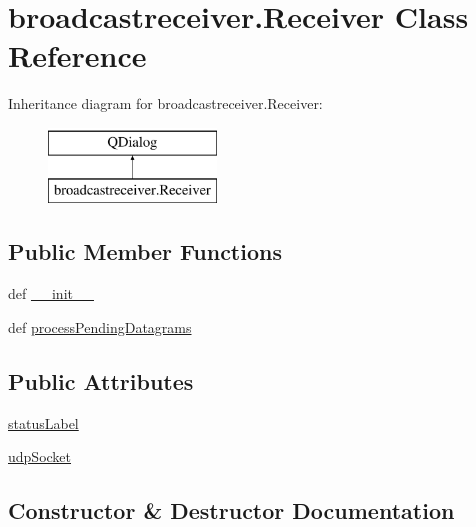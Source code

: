 \hypertarget{classbroadcastreceiver_1_1Receiver}{}\section{broadcastreceiver.\+Receiver Class Reference}
\label{classbroadcastreceiver_1_1Receiver}
Inheritance diagram for broadcastreceiver.\+Receiver\+:\begin{figure}[H]
\begin{center}
\leavevmode
\includegraphics[height=2.000000cm]{classbroadcastreceiver_1_1Receiver}
\end{center}
\end{figure}
\subsection*{Public Member Functions}
\begin{DoxyCompactItemize}
\item 
def \hyperlink{classbroadcastreceiver_1_1Receiver_a428275e39b69ec20a9a3bb9dce38a00a}{\+\_\+\+\_\+init\+\_\+\+\_\+}
\item 
def \hyperlink{classbroadcastreceiver_1_1Receiver_a450340ca9328e1c5d5d6a6bd5aef8cbf}{process\+Pending\+Datagrams}
\end{DoxyCompactItemize}
\subsection*{Public Attributes}
\begin{DoxyCompactItemize}
\item 
\hyperlink{classbroadcastreceiver_1_1Receiver_a8ef41113f4c0fed6e9d542e4f0f60e47}{status\+Label}
\item 
\hyperlink{classbroadcastreceiver_1_1Receiver_a6ff8448876ac3020f74c2020649d074d}{udp\+Socket}
\end{DoxyCompactItemize}


\subsection{Constructor \& Destructor Documentation}
\hypertarget{classbroadcastreceiver_1_1Receiver_a428275e39b69ec20a9a3bb9dce38a00a}{}
